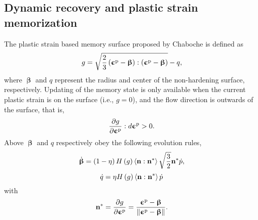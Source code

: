 \documentclass[preprint,5p,twocolumn,11pt,sort&compress]{elsarticle}
\newcommand{\bfepsilon}{{\bm{\upepsilon}}}
\newcommand{\bfbeta}{{\bm{\upbeta}}}
\newcommand{\bfn}{{\bf n}}
\begin{document}
\subsection{Dynamic recovery and plastic strain memorization}
\noindent
The plastic strain based memory surface proposed by Chaboche \cite{Chaboche1986149} is defined as
\begin{equation}
\label{Equ:g1}
g = \sqrt {\frac{2}{3}\left( {{\bfepsilon^{\rm p}} - \bfbeta} \right):\left( {{\bfepsilon^{\rm p}} - \bfbeta} \right)}  - q,
\end{equation}
where $\bfbeta$ and $q$ represent the radius and center of the non-hardening surface, respectively.
Updating of the memory state is only available when the current plastic strain is on the surface (i.e., $g=0$), and the flow direction is outwards of the surface, that is,
\[
\frac{{\partial g}}{{\partial {\bfepsilon^{\rm p}}}}:d{\bfepsilon^{\rm p}} > 0.
\]
Above $\bfbeta$ and $q$ respectively obey the following evolution rules,
\begin{equation}
\label{Equ:dotbeta1}
\dot\bfbeta  = \left( {1 - \eta } \right)H\left( g \right)\left\langle {\bfn:{\bfn^*}} \right\rangle \sqrt {\frac{3}{2}} {\bfn^*}\dot p,
\end{equation}
\begin{equation}
\label{Equ:dotq1}
\dot q = \eta H\left( g \right)\left\langle {\bfn:{\bfn^*}} \right\rangle \dot p
\end{equation}
with
\begin{equation}
\label{Equ:nstar}
{\bfn^*} = \frac{{\partial g}}{{\partial {\bfepsilon^{\rm p}}}} = \frac{{{\bfepsilon^{\rm p}} - \bfbeta}}{{\left\| {{\bfepsilon^{\rm p}} - \bfbeta} \right\|}}.
\end{equation}
\end{document}
